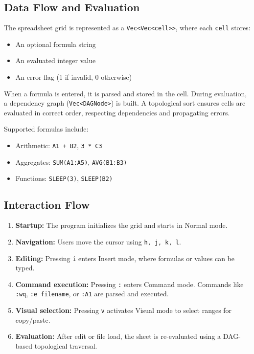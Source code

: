 \documentclass{article}
\begin{document}
\subsection{Data Flow and Evaluation}

The spreadsheet grid is represented as a \texttt{Vec<Vec<cell>>}, where each \texttt{cell} stores:
\begin{itemize}
  \item An optional formula string
  \item An evaluated integer value
  \item An error flag (1 if invalid, 0 otherwise)
\end{itemize}

When a formula is entered, it is parsed and stored in the cell. During evaluation, a dependency graph (\texttt{Vec<DAGNode>}) is built. A topological sort ensures cells are evaluated in correct order, respecting dependencies and propagating errors.

Supported formulas include:
\begin{itemize}
  \item Arithmetic: \texttt{A1 + B2}, \texttt{3 * C3}
  \item Aggregates: \texttt{SUM(A1:A5)}, \texttt{AVG(B1:B3)}
  \item Functions: \texttt{SLEEP(3)}, \texttt{SLEEP(B2)}
\end{itemize}

\subsection{Interaction Flow}

\begin{enumerate}
  \item \textbf{Startup:} The program initializes the grid and starts in Normal mode.
  \item \textbf{Navigation:} Users move the cursor using \texttt{h, j, k, l}.
  \item \textbf{Editing:} Pressing \texttt{i} enters Insert mode, where formulas or values can be typed.
  \item \textbf{Command execution:} Pressing \texttt{:} enters Command mode. Commands like \texttt{:wq}, \texttt{:e filename}, or \texttt{:A1} are parsed and executed.
  \item \textbf{Visual selection:} Pressing \texttt{v} activates Visual mode to select ranges for copy/paste.
  \item \textbf{Evaluation:} After edit or file load, the sheet is re-evaluated using a DAG-based topological traversal.
\end{enumerate}
\end{document}
